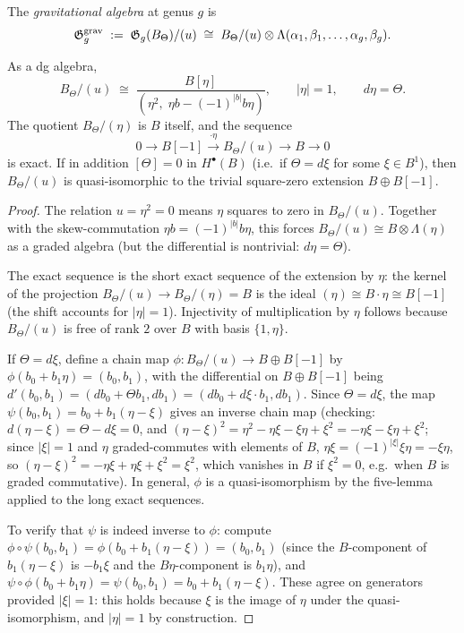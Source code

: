 \begin{definition}
The \emph{gravitational algebra} at genus $g$ is
\[
\mathfrak{G}_g^{\mathrm{grav}}
\;:=\;
\mathfrak{G}_g(B_\Theta)/(u)
\;\cong\;
B_\Theta/(u) \otimes \Lambda(\alpha_1,\beta_1,\dots,\alpha_g,\beta_g).
\]
\end{definition}

\begin{proposition}
\label{prop:tholog-bt-mod-u}
As a dg algebra,
\[
B_\Theta/(u)
\;\cong\;
\frac{B[\eta]}{(\eta^2, \;\eta b - (-1)^{|b|}b\eta)},
\qquad
|\eta| = 1,\qquad d\eta = \Theta.
\]
The quotient $B_\Theta/(\eta)$ is $B$ itself, and the sequence
\[
0 \to B[-1] \xrightarrow{\cdot\eta} B_\Theta/(u) \to B \to 0
\]
is exact.
If in addition $[\Theta] = 0$ in $H^\bullet(B)$
(i.e.\ if $\Theta = d\xi$ for some $\xi \in B^1$), then
$B_\Theta/(u)$ is quasi-isomorphic to the trivial
square-zero extension $B \oplus B[-1]$.
\end{proposition}

\begin{proof}
The relation $u = \eta^2 = 0$ means $\eta$ squares to zero in
$B_\Theta/(u)$.
Together with the skew-commutation $\eta b = (-1)^{|b|}b\eta$,
this forces $B_\Theta/(u) \cong B \otimes \Lambda(\eta)$
as a graded algebra (but the differential is nontrivial:
$d\eta = \Theta$).

The exact sequence is the short exact sequence of the extension
by $\eta$: the kernel of the projection
$B_\Theta/(u) \to B_\Theta/(\eta) = B$
is the ideal $(\eta) \cong B \cdot \eta \cong B[-1]$
(the shift accounts for $|\eta| = 1$).
Injectivity of multiplication by $\eta$ follows because
$B_\Theta/(u)$ is free of rank $2$ over $B$ with basis
$\{1, \eta\}$.

If $\Theta = d\xi$, define a chain map
$\phi : B_\Theta/(u) \to B \oplus B[-1]$
by $\phi(b_0 + b_1\eta) = (b_0, b_1)$, with the differential
on $B \oplus B[-1]$ being
$d'(b_0, b_1) = (db_0 + \Theta b_1, db_1)
= (db_0 + d\xi \cdot b_1, db_1)$.
Since $\Theta = d\xi$, the map
$\psi(b_0, b_1) = b_0 + b_1(\eta - \xi)$
gives an inverse chain map (checking: $d(\eta - \xi)
= \Theta - d\xi = 0$, and $(\eta - \xi)^2
= \eta^2 - \eta\xi - \xi\eta + \xi^2 = -\eta\xi - \xi\eta + \xi^2$;
since $|\xi| = 1$ and $\eta$ graded-commutes with elements of $B$,
$\eta\xi = (-1)^{|\xi|}\xi\eta = -\xi\eta$, so
$(\eta - \xi)^2 = -\eta\xi + \eta\xi + \xi^2 = \xi^2$,
which vanishes in $B$ if $\xi^2 = 0$, e.g.\ when $B$ is
graded commutative).
In general, $\phi$ is a quasi-isomorphism by the five-lemma
applied to the long exact sequences.

To verify that $\psi$ is indeed inverse to $\phi$: compute
$\phi \circ \psi(b_0, b_1) = \phi(b_0 + b_1(\eta - \xi))
= (b_0, b_1)$ (since the $B$-component of
$b_1(\eta - \xi)$ is $-b_1\xi$ and the $B\eta$-component
is $b_1\eta$), and
$\psi \circ \phi(b_0 + b_1\eta) = \psi(b_0, b_1)
= b_0 + b_1(\eta - \xi)$.
These agree on generators provided $|\xi| = 1$: this holds
because $\xi$ is the image of $\eta$ under the
quasi-isomorphism, and $|\eta| = 1$ by construction.
\end{proof}

